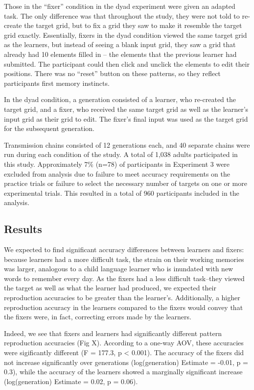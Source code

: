 \documentclass[10pt, letterpaper]{article}
\begin{document}
Those in the ``fixer'' condition in the dyad experiment were given an
adapted task. The only difference was that throughout the study, they
were not told to re-create the target grid, but to fix a grid they saw
to make it resemble the target grid exactly. Essentially, fixers in the
dyad condition viewed the same target grid as the learners, but instead
of seeing a blank input grid, they saw a grid that already had 10
elements filled in -- the elements that the previous learner had
submitted. The participant could then click and unclick the elements to
edit their positions. There was no ``reset'' button on these patterns,
so they reflect participants first memory instincts.

In the dyad condition, a generation consisted of a learner, who
re-created the target grid, and a fixer, who received the same target
grid as well as the learner's input grid as their grid to edit. The
fixer's final input was used as the target grid for the subsequent
generation.

Transmission chains consisted of 12 generations each, and 40 separate
chains were run during each condition of the study. A total of 1,038
adults participated in this study. Approximately 7\% (n=78) of
participants in Experiment 3 were excluded from analysis due to failure
to meet accuracy requirements on the practice trials or failure to
select the necessary number of targets on one or more experimental
trials. This resulted in a total of 960 participants included in the
analysis.

\hypertarget{results-2}{%
\subsection{Results}\label{results-2}}

We expected to find significant accuracy differences between learners
and fixers: because learners had a more difficult task, the strain on
their working memories was larger, analogous to a child language learner
who is inundated with new words to remember every day. As the fixers had
a less difficult task--they viewed the target as well as what the
learner had produced, we expected their reproduction accuracies to be
greater than the learner's. Additionally, a higher reproduction accuracy
in the learners compared to the fixers would convey that the fixers
were, in fact, correcting errors made by the learners.

Indeed, we see that fixers and learners had significantly different
pattern reproduction accuracies (Fig X). According to a one-way AOV,
these accuracies were sigificantly different (F = 177.3, p \textless{}
0.001). The accuracy of the fixers did not increase significantly over
generations (log(generation) Estimate = -0.01, p = 0.3), while the
accuracy of the learners showed a marginally significant increase
(log(generation) Estimate = 0.02, p = 0.06).
\end{document}
